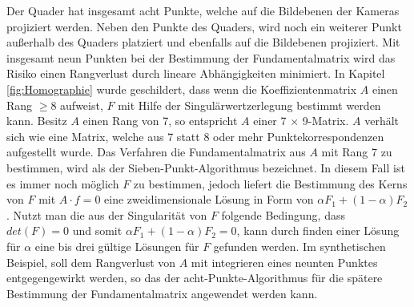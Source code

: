 

Der Quader hat insgesamt acht Punkte, welche auf die Bildebenen der Kameras projiziert werden. Neben den Punkte des Quaders, wird noch ein weiterer Punkt außerhalb des Quaders platziert und ebenfalls auf die Bildebenen projiziert. Mit insgesamt neun Punkten bei der Bestimmung der Fundamentalmatrix wird das Risiko einen Rangverlust durch lineare Abhängigkeiten minimiert\cite{HZ}. In Kapitel \ref{fig:Homographie} wurde geschildert, dass wenn die Koeffizientenmatrix $A$ einen Rang $\geq 8$ aufweist, $F$ mit Hilfe der Singulärwertzerlegung bestimmt werden kann\cite{HZ,Schwarz}. Besitz $A$ einen Rang von 7, so entspricht $A$ einer 7 $\times$ 9-Matrix. $A$ verhält sich wie eine Matrix, welche aus 7 statt 8 oder mehr Punktekorrespondenzen aufgestellt wurde. Das Verfahren die Fundamentalmatrix aus $A$ mit Rang 7 zu bestimmen, wird als der Sieben-Punkt-Algorithmus bezeichnet\cite{HZ,LongQuan}. In diesem Fall ist es immer noch möglich $F$ zu bestimmen, jedoch liefert die Bestimmung des Kerns von $F$ mit $A\cdot f = 0$ eine zweidimensionale Lösung in Form von $\alpha F_1 + (1- \alpha)F_2$\cite{HZ,LongQuan}. Nutzt man die aus der Singularität von $F$ folgende Bedingung, dass $det(F) = 0$ und somit  $\alpha F_1 + (1- \alpha)F_2 =0$, kann durch finden einer Lösung für $\alpha$ eine bis drei gültige Lösungen für $F$ gefunden werden\cite{HZ,LongQuan}. Im synthetischen Beispiel, soll dem Rangverlust von $A$ mit integrieren eines neunten Punktes entgegengewirkt werden, so das der acht-Punkte-Algorithmus für die spätere Bestimmung der Fundamentalmatrix angewendet werden kann.\\


%

